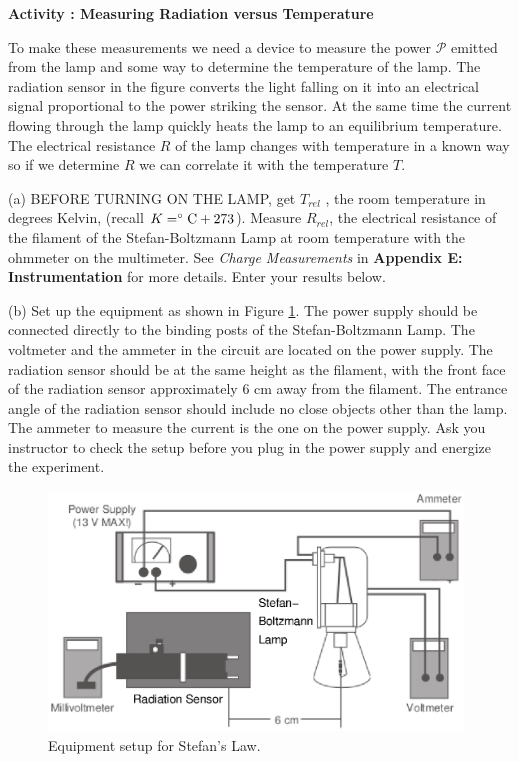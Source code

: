 \textbf{Activity : Measuring Radiation versus Temperature}

To make these measurements we need a device to measure the power $\mathscr{P}$ emitted from the lamp and
some way to determine the temperature of the lamp.
The radiation sensor in the figure converts the light falling on it into an electrical signal
proportional to the power striking the sensor.
At the same time the current flowing through the lamp quickly heats the lamp to an equilibrium temperature.
The electrical resistance $R$ of the lamp changes with temperature in a known way so if we determine
$R$ we can correlate it with the temperature $T$.

(a) BEFORE TURNING ON THE LAMP, get $T_{rel}$ , the room temperature in degrees
Kelvin, (recall ${K=^\circ \rm C + 273}$). 
Measure $R_{rel}$, the electrical resistance of the 
filament of the Stefan-Boltzmann Lamp
at room temperature with the ohmmeter on the multimeter. 
See {\it Charge Measurements} in {\bf Appendix E: Instrumentation} for more details. 
Enter your results below.
\vspace{30mm}

(b) Set up the equipment as shown in Figure \ref{setup}. The power supply should be connected directly to
the binding posts of the Stefan-Boltzmann Lamp. The voltmeter and the 
ammeter in the circuit are located on the power supply.
The radiation sensor should be at the same height as
the filament, with the front face of the radiation sensor approximately 6 cm away from the filament.
The entrance angle of the radiation sensor should include no close objects other than the lamp.
The ammeter to measure the current is the one on the power supply.
Ask you instructor to check the setup before you plug in the power supply and energize the
experiment.

\begin{figure}[hbt]
\begin{center}
\includegraphics[height=2.5in]{stefansLaw/stefansLawFig1h.eps}
\caption{Equipment setup for Stefan's Law.}\label{setup}
\end{center}
\end{figure}


